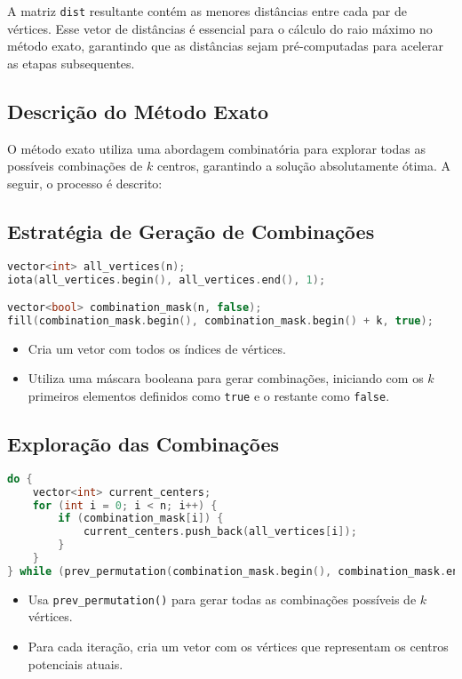 \documentclass[10pt,conference]{IEEEtran}
\begin{document}
\noindent A matriz \texttt{dist} resultante contém as menores distâncias entre cada par de vértices. Esse vetor de distâncias é essencial para o cálculo do raio máximo no método exato, garantindo que as distâncias sejam pré-computadas para acelerar as etapas subsequentes.

\subsection{Descrição do Método Exato}
O método exato utiliza uma abordagem combinatória para explorar todas as possíveis combinações de \(k\) centros, garantindo a solução absolutamente ótima. A seguir, o processo é descrito:

\subsection{Estratégia de Geração de Combinações}
\begin{lstlisting}[language=C++, caption=Código para Geração de Combinações]
vector<int> all_vertices(n);
iota(all_vertices.begin(), all_vertices.end(), 1);

vector<bool> combination_mask(n, false);
fill(combination_mask.begin(), combination_mask.begin() + k, true);
\end{lstlisting}
\begin{itemize}
    \item Cria um vetor com todos os índices de vértices.
    \item Utiliza uma máscara booleana para gerar combinações, iniciando com os \(k\) primeiros elementos definidos como \texttt{true} e o restante como \texttt{false}.
\end{itemize}

\subsection{Exploração das Combinações}
\begin{lstlisting}[language=C++, caption=Código para Exploração de Combinações]
do {
    vector<int> current_centers;
    for (int i = 0; i < n; i++) {
        if (combination_mask[i]) {
            current_centers.push_back(all_vertices[i]);
        }
    }
} while (prev_permutation(combination_mask.begin(), combination_mask.end()));
\end{lstlisting}
\begin{itemize}
    \item Usa \texttt{prev\_permutation()} para gerar todas as combinações possíveis de \(k\) vértices.
    \item Para cada iteração, cria um vetor com os vértices que representam os centros potenciais atuais.
\end{itemize}
\end{document}
